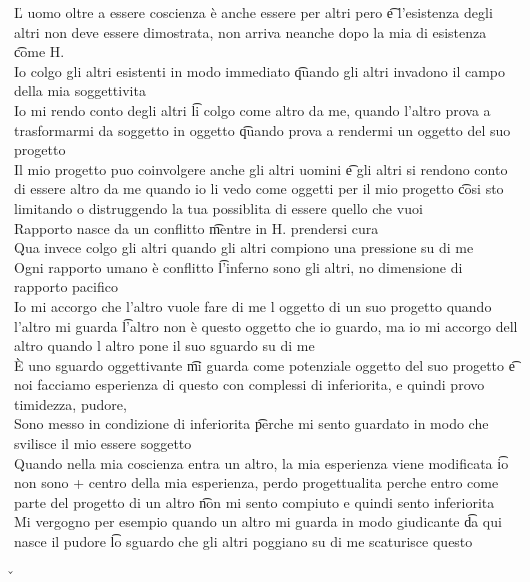 \documentclass[12pt]{article}
\begin{document}
\v

L uomo oltre a essere coscienza è anche essere per altri pero \t e l'esistenza degli altri non deve essere dimostrata, non arriva neanche dopo la mia di esistenza \t come H. \\
Io colgo gli altri esistenti in modo immediato \t quando gli altri invadono il campo della mia soggettivita \\
Io mi rendo conto degli altri \t li colgo come altro da me, quando l'altro prova a trasformarmi da soggetto in oggetto \t quando prova a rendermi un oggetto del suo progetto \\
Il mio progetto puo coinvolgere anche gli altri uomini \t e gli altri si rendono conto di essere altro da me quando io li vedo come oggetti per il mio progetto \t cosi sto limitando o distruggendo la tua possiblita di essere quello che vuoi \\
Rapporto nasce da un conflitto \t mentre in H. prendersi cura \\
Qua invece colgo gli altri quando gli altri compiono una pressione su di me \\
Ogni rapporto umano è conflitto \t l'inferno sono gli altri, no dimensione di rapporto pacifico \\
Io mi accorgo che l'altro vuole fare di me l oggetto di un suo progetto quando l'altro mi guarda \t l'altro non è questo oggetto che io guardo, ma io mi accorgo dell altro quando l altro pone il suo sguardo su di me \\
È uno sguardo oggettivante \t mi guarda come potenziale oggetto del suo progetto \t e noi facciamo esperienza di questo con complessi di inferiorita, e quindi provo timidezza, pudore, \\
Sono messo in condizione di inferiorita \t perche mi sento guardato in modo che svilisce il mio essere soggetto \\
Quando nella mia coscienza entra un altro, la mia esperienza viene modificata \t io non sono + centro della mia esperienza, perdo progettualita perche entro come parte del progetto di un altro \t non mi sento compiuto e quindi sento inferiorita \\
Mi vergogno per esempio quando un altro mi guarda in modo giudicante \t da qui nasce il pudore \t lo sguardo che gli altri poggiano su di me scaturisce questo

\v
\end{document}
